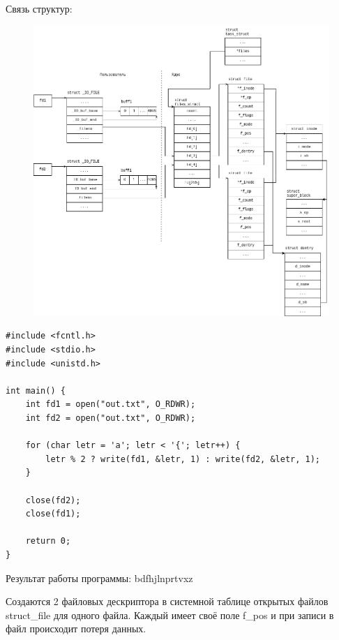 \newpage
Связь структур:
\begin{figure}[H]
	\centering
	\includegraphics[scale=0.5]{img/d_3.png}
\end{figure}

\clearpage

\begin{lstlisting}
#include <fcntl.h>
#include <stdio.h>
#include <unistd.h>

int main() {
	int fd1 = open("out.txt", O_RDWR);
	int fd2 = open("out.txt", O_RDWR);
	
	for (char letr = 'a'; letr < '{'; letr++) {
		letr % 2 ? write(fd1, &letr, 1) : write(fd2, &letr, 1);
	}
		
	close(fd2);
	close(fd1);
	
	return 0;
}
\end{lstlisting}

Результат работы программы:\newline
bdfhjlnprtvxz

Создаются 2 файловых дескриптора  в системной таблице открытых файлов struct\_file для одного файла. Каждый имеет своё поле f\_pos и при записи в файл происходит потеря данных.
